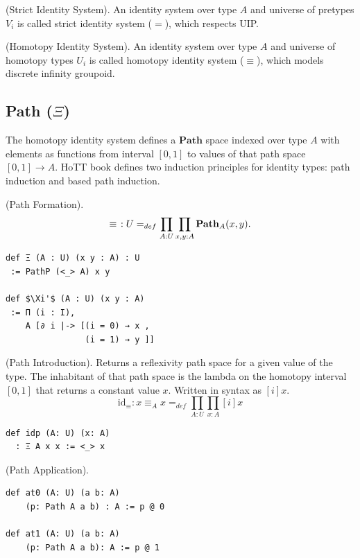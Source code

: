\documentclass{article}
\begin{document}
\begin{definition} (Strict Identity System).
An identity system over type $A$ and universe
of pretypes $V_i$ is called strict identity system ($=$), which respects UIP.
\end{definition}

\begin{definition} (Homotopy Identity System).
An identity system over type $A$ and universe of homotopy
types $U_i$ is called homotopy identity system ($\equiv$),
which models discrete infinity groupoid.
\end{definition}

\newpage
\subsection{Path ($\Xi$)}
The homotopy identity system defines a $\mathbf{Path}$
space indexed over type $A$
with elements as functions from interval $[0,1]$ to values
of that path space $[0,1] \rightarrow A$. HoTT book
defines two induction principles for identity types:
path induction and based path induction.

\begin{definition} (Path Formation).
$$
  \equiv\hspace{0.4em}: U =_{def} \prod_{A:U}\prod_{x,y:A} \mathbf{Path}_A(x,y).
$$
\begin{lstlisting}[mathescape=true]
def Ξ (A : U) (x y : A) : U
 := PathP (<_> A) x y

def $\Xi'$ (A : U) (x y : A)
 := Π (i : I),
    A [∂ i |-> [(i = 0) → x ,
                (i = 1) → y ]]
\end{lstlisting}
\end{definition}

\begin{definition} (Path Introduction).
Returns a reflexivity path space for a given value of the type.
The inhabitant of that path space is the lambda on the homotopy
interval $[0,1]$ that returns a constant value $x$. Written in
syntax as $[i]x$.
$$
  \mathrm{id_\equiv} : x \equiv_A x =_{def} \prod_{A:U}\prod_{x:A} [i] x
$$
\begin{lstlisting}[mathescape=true]
def idp (A: U) (x: A)
  : Ξ A x x := <_> x
\end{lstlisting}
\end{definition}

\begin{definition} (Path Application).
\begin{lstlisting}[mathescape=true]
def at0 (A: U) (a b: A)
    (p: Path A a b) : A := p @ 0

def at1 (A: U) (a b: A)
    (p: Path A a b): A := p @ 1
\end{lstlisting}
\end{definition}
\end{document}
